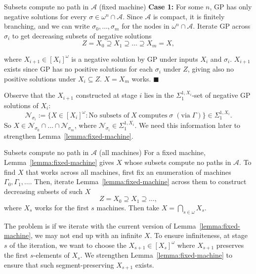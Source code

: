 \begin{frame}{Subsets compute no path in $\mathcal{A}$ (fixed machine)}
  \textbf{Case 1:} For some $n$, GP has only negative solutions for every
  $\sigma\in\omega^n\cap\mathcal{A}$. Since $\mathcal{A}$ is compact, it is
  finitely branching, and we can write $\sigma_0,\ldots,\sigma_m$ for the
  nodes in $\omega^n\cap\mathcal{A}$. Iterate GP across $\sigma_i$ to get
  decreasing subsets of negative solutions
  \[Z=X_0 \supseteq X_1 \supseteq \ldots\supseteq X_m=X,\]

  where $X_{i+1}\in[X_i]^\omega$ is a negative solution by GP under
  inputs $X_i$ and $\sigma_i$. $X_{i+1}$ exists since GP has no positive
  solutions for each $\sigma_i$ under $Z$, giving also no
  positive solutions under $X_i\subseteq Z$. $X=X_m$ works. $\blacksquare$

  \vspace{0.5em}
  Observe that the $X_{i+1}$ constructed at stage $i$ lies in the
  $\Sigma_1^{1,X_i}$-set of negative GP solutions of $X_i$:
  \[\mathcal{N}_{\sigma_i}:= \{X\in[X_i]^\omega: \text{No subsets of}\; X\;
  \text{computes}\; \sigma\; (\text{via}\; \Gamma)\}
  \in\Sigma_1^{1,X_i}.\]
  So $X \in\mathcal{N}_{\sigma_0}\cap\ldots\cap\mathcal{N}_{\sigma_m}$,
  where $\mathcal{N}_{\sigma_i}\in\Sigma_1^{1,X_i}$. We need this
  information later to strengthen Lemma~\ref{lemma:fixed-machine}.
\end{frame}

\begin{frame}{Subsets compute no path in $\mathcal{A}$ (all machines)}
  For a fixed machine, Lemma~\ref{lemma:fixed-machine} gives $X$ whose
  subsets compute no paths in $\mathcal{A}$. To find $X$ that works across
  all machines, first fix an enumeration of machines
  $\Gamma_0,\Gamma_1,\ldots$. Then, iterate Lemma~\ref{lemma:fixed-machine}
  across them to construct decreasing subsets of such $X$
  \[Z= X_0\supseteq X_1\supseteq \ldots,\]
  where $X_s$ works for the first $s$ machines. Then take
  $X=\bigcap_{s\in\omega}X_s$.

  \vspace{1em}
  The problem is if we iterate with the current version of
  Lemma~\ref{lemma:fixed-machine}, we may not end up with an infinite $X$.
  To ensure infiniteness, at stage $s$ of the iteration, we want to choose
  the $X_{s+1}\in[X_s]^\omega$ where $X_{s+1}$ preserves the first
  $s$-elements of $X_s$. We strengthen Lemma~\ref{lemma:fixed-machine} to
  ensure that such segment-preserving $X_{s+1}$ exists.
\end{frame}

